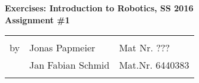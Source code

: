 \documentclass[11pt]{article}
\begin{document}
	
	\begin{center}
		\textbf{
			Exercises: Introduction to Robotics, SS 2016\\
			Assignment \#1\\
		}
		
		\begin{tabular}{lll}
			& \\
			by & Jonas Papmeier & Mat Nr. ???\\
			& Jan Fabian Schmid & Mat.Nr. 6440383\\
			\\
			\hline
		\end{tabular}
	\end{center}
	
	
	
	
	
	
	
\end{document}
